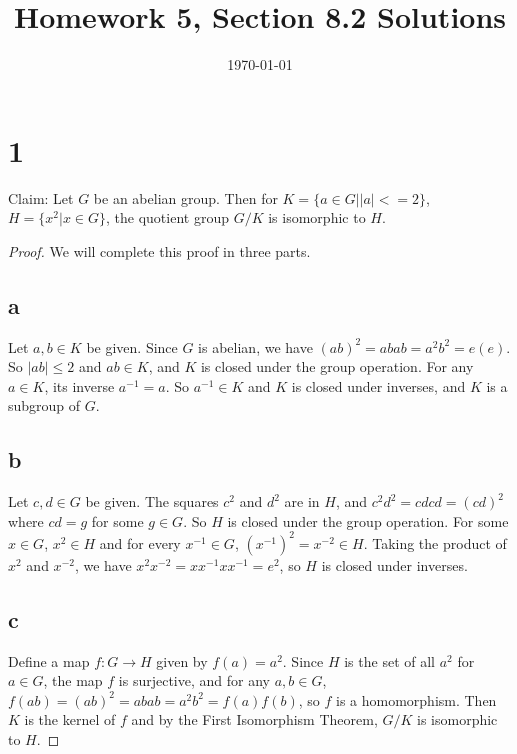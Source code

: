 \documentclass{article}
\title{\textbf{Homework 5, Section 8.2 Solutions}}
\date{}
\date\today
\begin{document}
\maketitle %

\thispagestyle{firstpage}
\section*{1}

Claim: Let $G$ be an abelian group.  Then for $K = \{a \in G | |a| <= 2 \}$, 
$H = \{ x^2 | x \in G \}$, the quotient group $G/K$ is isomorphic to $H$.

\begin{proof}
    We will complete this proof in three parts.

    \subsection*{a}

    Let $a, b \in K$ be given.  Since $G$ is abelian, we have $(ab)^2 = abab = a^2 b^2 = e(e)$.  So 
    $|ab| \leq 2$ and $ab \in K$, and $K$ is closed under the group operation. For any $a \in K$, its 
    inverse $a^{-1} = a$.  So $a^{-1} \in K$ and $K$ is closed under inverses, and $K$ is a subgroup of $G$. \\ 

    \subsection*{b}
    Let $c, d \in G$ be given.  The squares $c^2$ and $d^2$ are in $H$, and $c^2 d^2 = cdcd = (cd)^2$ where 
    $cd = g$ for some $g \in G$.  So $H$ is closed under the group operation.  For some $x \in G$, 
    $x^2 \in H$ and for every $x^{-1} \in G$, $(x^{-1})^2 = x^{-2} \in H$.  Taking the product 
    of $x^2$ and $x^{-2}$, we have $x^2 x^{-2} = xx^{-1}xx^{-1} = e^2$, so $H$ is closed under 
    inverses.

    \subsection*{c}
    Define a map $f:G \rightarrow H$ given by $f(a) = a^2$.  Since $H$ is the set of all 
    $a^2$ for $a \in G$, the map $f$ is surjective, and for any $a, b \in G$, $f(ab) = (ab)^2 = abab = a^2 b^2 = f(a)f(b)$, 
    so $f$ is a homomorphism.  Then $K$ is the kernel of 
    $f$ and by the First Isomorphism Theorem, $G/K$ is isomorphic to $H$.
\end{proof}
\end{document}
